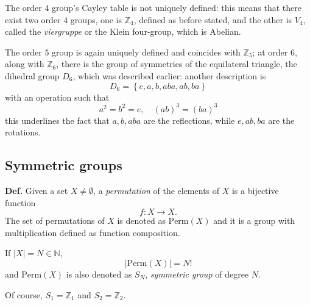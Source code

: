 
The order $4$ group's Cayley table is not uniquely defined: this means that there
exist two order $4$ groups, one is $\mathbb{Z}_4$, defined as before stated, and the
other is $V_4$, called the \textit{viergruppe} or the Klein four-group, which is
Abelian.

The order $5$ group is again uniquely defined and coincides with $\mathbb{Z}_5$; at
order $6$, along with $\mathbb{Z}_6$, there is the group of symmetries of the
equilateral triangle, the dihedral group $D_6$, which was described earlier:
another description is
$$D_6 = \left\{e,a,b,aba,ab,ba\right\}$$
with an operation such that
$$a^2=b^2 = e,\quad (ab)^3=(ba)^3$$
this underlines the fact that $a,b,aba$ are the reflections, while $e,ab,ba$ are
the rotations.
\subsection{Symmetric groups}
\textbf{Def.} Given a set $X\neq\emptyset$, a \textit{permutation} of the elements
of $X$ is a bijective function
$$f: X\rightarrow X.$$
The set of permutations of $X$ is denoted as $\text{Perm}(X)$ and it is a group with
multiplication defined as function composition.

If $|X|=N\in\mathbb{N}$,
$$|\text{Perm}(X)| = N!$$
and $\text{Perm}(X)$ is also denoted as $S_N$, \textit{symmetric group} of degree $N$.

Of course, $S_1=\mathbb{Z}_1$ and $S_2=\mathbb{Z}_2$.\\

